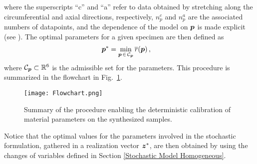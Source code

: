 where the superscripts ``c'' and ``a'' refer to data obtained by stretching along the circumferential and axial directions, respectively, $n_p^c$ and $n_p^a$ are the associated numbers of datapoints, and the dependence of the model on $\boldsymbol{p}$ is made explicit (see \cite{Brinkhues2013ModelingAS}). The optimal parameters for a given specimen are then defined as 
\begin{align}
    \boldsymbol{p}^* &= \min_{\boldsymbol{p}\,\in\,\mathcal{C}_{\boldsymbol{p}}} \overline{r}(\boldsymbol{p})\,, \label{identification_minimize}
\end{align}
where $\mathcal{C}_{\boldsymbol{p}} \subset \mathbb{R}^6$ is the admissible set for the parameters. This procedure is summarized in the flowchart in Fig.~\ref{fig:flowchart}. 
\begin{figure}[ht!]
    \begin{center}
        \texttt{[image: Flowchart.png]}
    \end{center}
    \caption[Summary of the deterministic calibration.]{Summary of the procedure enabling the deterministic calibration of material parameters on the synthesized samples.}
    \label{fig:flowchart}
\end{figure}
Notice that the optimal values for the parameters involved in the stochastic formulation, gathered in a realization vector $\boldsymbol{z}^*$, are then obtained by using the changes of variables defined in Section \ref{Stochastic Model Homogeneous}.

